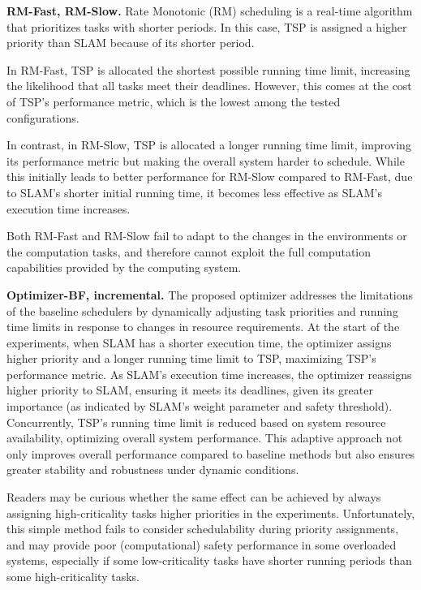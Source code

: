 	\textbf{RM-Fast, RM-Slow.} Rate Monotonic (RM) scheduling is a real-time algorithm that prioritizes tasks with shorter periods. In this case, TSP is assigned a higher priority than SLAM because of its shorter period.

    In RM-Fast, TSP is allocated the shortest possible running time limit, increasing the likelihood that all tasks meet their deadlines. However, this comes at the cost of TSP's performance metric, which is the lowest among the tested configurations.

    In contrast, in RM-Slow, TSP is allocated a longer running time limit, improving its performance metric but making the overall system harder to schedule. While this initially leads to better performance for RM-Slow compared to RM-Fast, due to SLAM's shorter initial running time, it becomes less effective as SLAM's execution time increases.

    Both RM-Fast and RM-Slow fail to adapt to the changes in the environments or the computation tasks, and therefore cannot exploit the full computation capabilities provided by the computing system.

	\textbf{Optimizer-BF, incremental.}
    The proposed optimizer addresses the limitations of the baseline schedulers by dynamically adjusting task priorities and running time limits in response to changes in resource requirements.
    At the start of the experiments, when SLAM has a shorter execution time, the optimizer assigns higher priority and a longer running time limit to TSP, maximizing TSP's performance metric.
    As SLAM's execution time increases, the optimizer reassigns higher priority to SLAM, ensuring it meets its deadlines, given its greater importance (as indicated by SLAM's weight parameter and safety threshold). Concurrently, TSP's running time limit is reduced based on system resource availability, optimizing overall system performance.
    This adaptive approach not only improves overall performance compared to baseline methods but also ensures greater stability and robustness under dynamic conditions.

    Readers may be curious whether the same effect can be achieved by always assigning high-criticality tasks higher priorities in the experiments. Unfortunately, this simple method fails to consider schedulability during priority assignments, and may provide poor (computational) safety performance in some overloaded systems, especially if some low-criticality tasks have shorter running periods than some high-criticality tasks.



